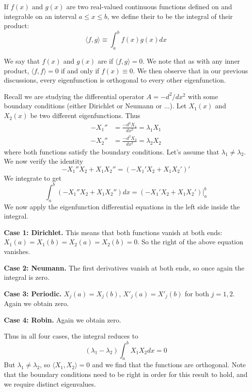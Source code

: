 \documentclass[12pt, a4paper, oneside, openright, titlepage]{book}
\begin{document}
\begin{defn}
    If $f(x)$ and $g(x)$ are two real-valued continuous functions defined on and integrable on an interval $a\leq x \leq b$, we define their  to be the integral of their product: \begin{equation}
        \langle f,g\rangle \equiv \int_a^bf(x)g(x)dx
    \end{equation}
\end{defn}

We say that $f(x)$ and $g(x)$ are  if $\langle f, g\rangle = 0$. We note that as with any inner product, $\langle f, f\rangle = 0$ if and only if $f(x) \equiv 0$. We then observe that in our previous discussions, every eigenfunction is orthogonal to every other eigenfunction. 

Recall we are studying the differential operator $A = -d^2/dx^2$ with some boundary conditions (either Dirichlet or Neumann or ...). Let $X_1(x)$ and $X_2(x)$ be two different eigenfunctions. Thus \begin{align*}
    -X_1'' &= \frac{-d^2X_1}{dx^2} = \lambda_1X_1 \\
    -X_2'' &= \frac{-d^2X_2}{dx^2} = \lambda_2X_2
\end{align*}
where both functions satisfy the boundary conditions. Let's assume that $\lambda_1 \neq \lambda_2$. We now verify the identity \begin{equation*}
    -X_1''X_2 + X_1X_2'' = (-X_1'X_2+X_1X_2')'
\end{equation*}
We integrate to get \begin{equation}
    \int_a^b(-X_1''X_2+X_1X_2'')dx = (-X_1'X_2+X_1X_2')\Bigg\rvert_a^b
\end{equation}
We now apply the eigenfunction differential equations in the left side inside the integral.

\textbf{Case 1: Dirichlet.} This means that both functions vanish at both ends: $X_1(a) = X_1(b) = X_2(a) = X_2(b) = 0$. So the right of the above equation vanishes.

\textbf{Case 2: Neumann.} The first derivatives vanish at both ends, so once again the integral is zero.

\textbf{Case 3: Periodic.} $X_j(a) = X_j(b)$, $X'_j(a) = X'_j(b)$ for both $j = 1,2$. Again we obtain zero.


\textbf{Case 4: Robin.} Again we obtain zero.

Thus in all four cases, the integral reduces to \begin{equation*}
    (\lambda_1-\lambda_2)\int_a^bX_1X_2dx = 0
\end{equation*}
But $\lambda_1 \neq \lambda_2$, so $\langle X_1,X_2\rangle = 0$ and we find that the functions are orthogonal. Note that the boundary conditions need to be right in order for this result to hold, and we require distinct eigenvalues.
\end{document}
